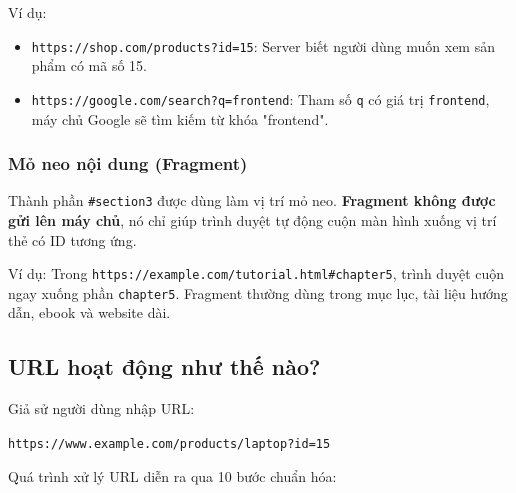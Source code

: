 \documentclass[11pt,oneside]{book}
\newcommand{\codeinline}[1]{\textcolor{accentOrange}{\texttt{#1}}}
\begin{document}
Ví dụ:
\begin{itemize}[leftmargin=1.8em, itemsep=2pt, parsep=0pt]
    \item \codeinline{https://shop.com/products?id=15}: Server biết người dùng muốn xem sản phẩm có mã số 15.
    \item \codeinline{https://google.com/search?q=frontend}: Tham số \codeinline{q} có giá trị \codeinline{frontend}, máy chủ Google sẽ tìm kiếm từ khóa "frontend".
\end{itemize}

\subsubsection{Mỏ neo nội dung (Fragment)}
Thành phần \codeinline{\#section3} được dùng làm vị trí mỏ neo. \textbf{Fragment không được gửi lên máy chủ}, nó chỉ giúp trình duyệt tự động cuộn màn hình xuống vị trí thẻ có ID tương ứng.

Ví dụ: Trong \codeinline{https://example.com/tutorial.html\#chapter5}, trình duyệt cuộn ngay xuống phần \codeinline{chapter5}. Fragment thường dùng trong mục lục, tài liệu hướng dẫn, ebook và website dài.

\subsection{URL hoạt động như thế nào?}

Giả sử người dùng nhập URL:
\begin{center}
\codeinline{https://www.example.com/products/laptop?id=15}
\end{center}

Quá trình xử lý URL diễn ra qua 10 bước chuẩn hóa:
\end{document}
